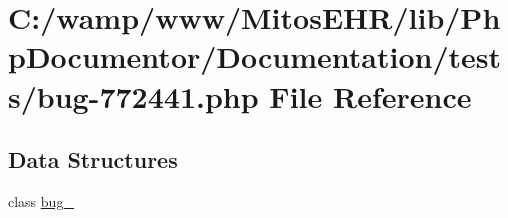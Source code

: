 \hypertarget{bug-772441_8php}{\section{\-C\-:/wamp/www/\-Mitos\-E\-H\-R/lib/\-Php\-Documentor/\-Documentation/tests/bug-\/772441.php \-File \-Reference}
\label{bug-772441_8php}
}
\subsection*{\-Data \-Structures}
\begin{DoxyCompactItemize}
\item 
class \hyperlink{classbug__772441}{bug\-\_}
\end{DoxyCompactItemize}
